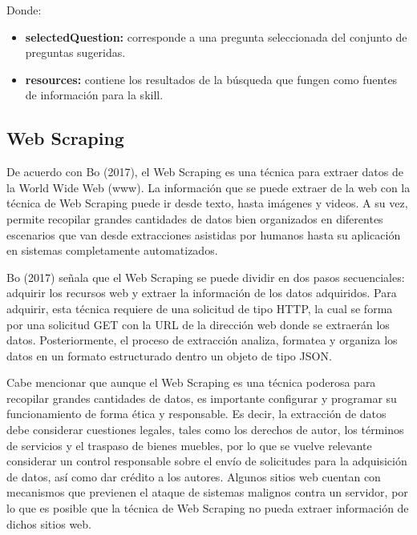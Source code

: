 Donde:

\begin{itemize}
  \item \textbf{selectedQuestion:} corresponde a una pregunta seleccionada del conjunto de preguntas sugeridas.
  \item \textbf{resources:} contiene los resultados de la búsqueda que fungen como fuentes de información para la skill.
\end{itemize}


\subsection{Web Scraping}
\label{WebScrapingcapIV}

De acuerdo con Bo (2017), el Web Scraping es una técnica para extraer datos de la World Wide Web (www). La información que se puede extraer de la web con la técnica de Web Scraping puede ir desde texto, hasta imágenes y videos. A su vez, permite recopilar grandes cantidades de datos bien organizados en diferentes escenarios que van desde extracciones asistidas por humanos hasta su aplicación en sistemas completamente automatizados.

Bo (2017) señala que el Web Scraping se puede dividir en dos pasos secuenciales: adquirir los recursos web y extraer la información de los datos adquiridos. Para adquirir, esta técnica requiere de una solicitud de tipo HTTP, la cual se forma por una solicitud GET con la URL de la dirección web donde se extraerán los datos. Posteriormente, el proceso de extracción analiza, formatea y organiza los datos en un formato estructurado dentro un objeto de tipo JSON.

Cabe mencionar que aunque el Web Scraping es una técnica poderosa para recopilar grandes cantidades de datos, es importante configurar y programar su funcionamiento de forma ética y responsable. Es decir, la extracción de datos debe considerar cuestiones legales, tales como los derechos de autor, los términos de servicios y el traspaso de bienes muebles, por lo que se vuelve relevante considerar un control responsable sobre el envío de solicitudes para la adquisición de datos, así como dar crédito a los autores. Algunos sitios web cuentan con mecanismos que previenen el ataque de sistemas malignos contra un servidor, por lo que es posible que la técnica de Web Scraping no pueda extraer información de dichos sitios web.

